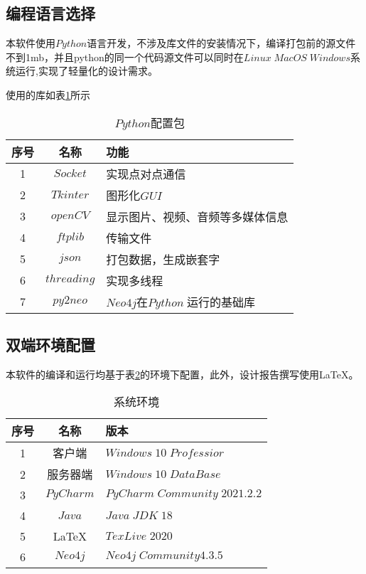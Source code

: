 \documentclass[forprint]{sql}
\begin{document}
\subsection{编程语言选择}

本软件使用$ Python $语言开发，不涉及库文件的安装情况下，编译打包前的源文件不到1mb，并且python的同一个代码源文件可以同时在$Linux \; MacOS \; Windows$系统运行,实现了轻量化的设计需求。

使用的库如表\ref{table:1}所示
\begin{table}[ht]\centering
	\caption{$Python$配置包}
	\label{table:1}
	\begin{tabular}{ccl}
		\hline
		序号 & 名称       & 功能                           \\ \hline
		1  & $Socket$    & 实现点对点通信                   \\
		2  & $Tkinter$   & 图形化$GUI$                      \\
		3  & $openCV$    & 显示图片、视频、音频等多媒体信息    \\
		4  & $ftplib$    & 传输文件                           \\
		5  & $json$      & 打包数据，生成嵌套字                \\
		6  & $threading$ & 实现多线程                          \\
		7  & $py2neo$    & $Neo4j$在$Python \;$运行的基础库     \\ \hline
	\end{tabular}
\end{table}

\subsection{双端环境配置}

本软件的编译和运行均基于表\ref{table:2}的环境下配置，此外，设计报告撰写使用\LaTeX{}。

\begin{table}[ht]\centering
	\caption{系统环境}
	\label{table:2}
	\begin{tabular}{ccl}
		\hline
		序号 & 名称        & 版本                                                        \\ \hline
		1  & 客户端       & $Windows \;10 \; Professior$                              \\
		2  & 服务器端      & $Windows \; 10 \; DataBase $\\
		3  & $PyCharm$ & $PyCharm \; Community \; 2021.2.2$                        \\
		4  & $Java$    & $Java \; JDK \; 18$                                       \\
		5  & \LaTeX{}   & $TexLive \; 2020$                                      \\
		6  & $Neo4j$   & $Neo4j \; Community 4.3.5$                                \\ \hline
	\end{tabular}
\end{table}
\end{document}
